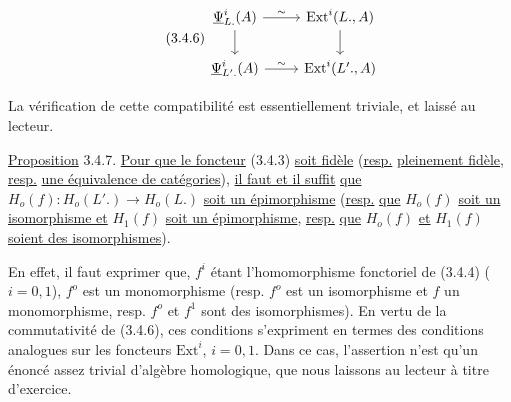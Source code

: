 \begin{equation}\tag{3.4.6}
\begin{tikzcd}
\underline{\Psi}^i_{L.}(A) \arrow[r, "\sim"] \arrow[d] & \mathrm{Ext}^i(L.,A) \arrow[d] \\
\underline{\Psi}^i_{L'.}(A) \arrow[r, "\sim"] & \mathrm{Ext}^i(L'.,A)
\end{tikzcd}
\end{equation}


La vérification de cette compatibilité est essentiellement triviale, et laissé au lecteur.

\underline{Proposition} 3.4.7. \underline{Pour que le foncteur} (3.4.3) \underline{soit fidèle} (\underline{resp.} \underline{pleinement fidèle}, \underline{resp.} \underline{une équivalence de catégories}), \underline{il faut et il suffit} \underline{que} $H_o(f) : H_o(L'.) \longrightarrow H_o(L.)$ \underline{soit un épimorphisme} (\underline{resp.} \underline{que} $H_o(f)$ \underline{soit un isomorphisme et} $H_1(f)$ \underline{soit un épimorphisme}, \underline{resp.} \underline{que} $H_o(f)$ \underline{et} $H_1(f)$ \underline{soient des isomorphismes}).

En effet, il faut exprimer que, $f^i$ étant l'homomorphisme fonctoriel de (3.4.4) ($i=0,1$), $f^o$ est un monomorphisme (resp. $f^o$ est un isomorphisme et $f$ un monomorphisme, resp. $f^o$ et $f^1$ sont des isomorphismes). En vertu de la commutativité de (3.4.6), ces conditions s'expriment en termes des conditions analogues sur les foncteurs $\mathrm{Ext}^i$, $i=0,1$. Dans ce cas, l'assertion n'est qu'un énoncé assez trivial d'algèbre homologique, que nous laissons au lecteur à titre d'exercice.

